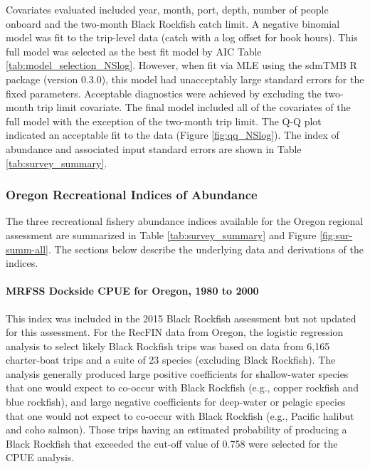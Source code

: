 \documentclass[11pt,
  english,
  letterpaper,
]{article}
\begin{document}
Covariates evaluated included year, month, port, depth, number of people onboard and the two-month Black Rockfish catch limit. A negative binomial model was fit to the trip-level data (catch with a log offset for hook hours). This full model was selected as the best fit model by AIC Table \ref{tab:model_selection_NSlog}. However, when fit via MLE using the sdmTMB R package (version 0.3.0), this model had unacceptably large standard errors for the fixed parameters. Acceptable diagnostics were achieved by excluding the two-month trip limit covariate. The final model included all of the covariates of the full model with the exception of the two-month trip limit. The Q-Q plot indicated an acceptable fit to the data (Figure \ref{fig:qq_NSlog}). The index of abundance and associated input standard errors are shown in Table \ref{tab:survey_summary}.

\hypertarget{oregon-recreational-indices-of-abundance}{%
\subsubsection{Oregon Recreational Indices of Abundance}\label{oregon-recreational-indices-of-abundance}}

The three recreational fishery abundance indices available for the Oregon regional assessment are summarized in Table \ref{tab:survey_summary} and Figure \ref{fig:sur-summ-all}. The sections below describe the underlying data and derivations of the indices.

\hypertarget{mrfss-dockside-cpue-for-oregon-1980-to-2000}{%
\paragraph{MRFSS Dockside CPUE for Oregon, 1980 to 2000}\label{mrfss-dockside-cpue-for-oregon-1980-to-2000}}

This index was included in the 2015 Black Rockfish assessment but not updated for this assessment. For the RecFIN data from Oregon, the logistic regression analysis to select likely Black Rockfish trips was based on data from 6,165 charter-boat trips and a suite of 23 species (excluding Black Rockfish). The analysis generally produced large positive coefficients for shallow-water species that one would expect to co-occur with Black Rockfish (e.g., copper rockfish and blue rockfish), and large negative coefficients for deep-water or pelagic species that one would not expect to co-occur with Black Rockfish (e.g., Pacific halibut and coho salmon). Those trips having an estimated probability of producing a Black Rockfish that exceeded the cut-off value of 0.758 were selected for the CPUE analysis.
\end{document}
